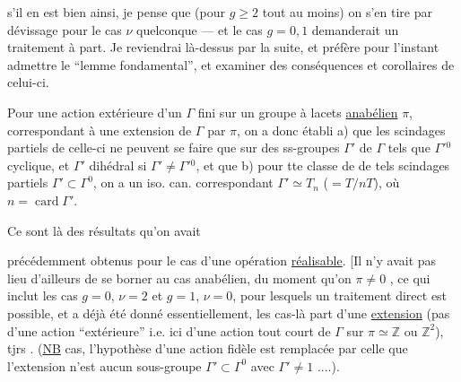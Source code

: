 

 s'il en
est bien ainsi, je pense que (pour $g\geq2$ tout
au moins) on s'en tire par dévissage
pour le cas $\nu$ quelconque --- et le cas $g=0,1$
demanderait  un traitement à part.
Je reviendrai là-dessus par la suite, et
préfère pour l'instant admettre le ``lemme
fondamental'', et examiner des conséquences
et corollaires de celui-ci.

Pour une action extérieure  d'un $\Gamma$ fini
sur un groupe à lacets \uline{anabélien} $\pi$, 
 correspondant à une extension  de $\Gamma$ par $\pi$,
on a donc établi a) que les scindages
partiels de celle-ci ne peuvent se faire
que sur des ss-groupes  $\Gamma'$ de $\Gamma$
tels que $\Gamma'{}^0$  cyclique, et $\Gamma'$ dihédral
si $\Gamma'\ne\Gamma'{}^0$, et que b) pour tte classe
de  de tels scindages partiels
 $\Gamma'\subset\Gamma^0$, on a un iso. can.
correspondant $\Gamma'\simeq T_n$ ($=T/nT$), où $n=\operatorname{card}\Gamma'$.

Ce sont là des résultats qu'on avait


précédemment obtenus pour le cas d'une
opération \uline{réalisable}. [Il n'y avait pas lieu
d'ailleurs de se borner au cas anabélien,
du moment qu'on  $\pi\ne0$ ,
ce qui inclut les cas  $g=0$, $\nu=2$ et
$g=1$, $\nu=0$, pour lesquels un traitement
direct est possible, et a déjà été donné
essentiellement, les cas-là  
part d'une \uline{extension} (pas d'une action
``extérieure'' i.e. ici d'une action tout court
de $\Gamma$ sur $\pi\simeq\mathbb Z$ ou $\mathbb Z^2$),  tjrs .
(\uline{NB}   cas, l'hypothèse d'une
action fidèle est remplacée par celle que
l'extension n'est    aucun
sous-groupe $\Gamma'\subset\Gamma^0$ avec $\Gamma'\ne1$ ....).


